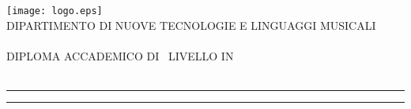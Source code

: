 
\begin{titlepage}

\areaset{450pt}{784pt}

  \begin{center}
    {\LARGE
      \texttt{[image: logo.eps]} \\[0.5cm]

      {\normalsize{DIPARTIMENTO DI NUOVE TECNOLOGIE E LINGUAGGI MUSICALI}} \\[-0.2cm]
      {} \\

      {\normalsize{DIPLOMA ACCADEMICO DI \myLevel~LIVELLO IN}} \\[-0.2cm]
      {\spacedlowsmallcaps{\myCourse}} \\[1cm]

      {\huge{\spacedlowsmallcaps{\myName}}}
      \vspace{-0.5cm}
      \par\noindent\rule{\textwidth}{0.4pt}\vspace{0.3cm}
		{\Huge{\color{bbari}\parbox{\textwidth}{\centering\spacedallcaps{\myFPTitle}}}}\vspace{0.3cm}
      \par\noindent\rule{\textwidth}{0.4pt}\vspace{0.3cm}}
        {\Large{\spacedlowsmallcaps{\mySubTitle}}} \\[.2cm]
	\vfill



\end{center}
\end{titlepage}
